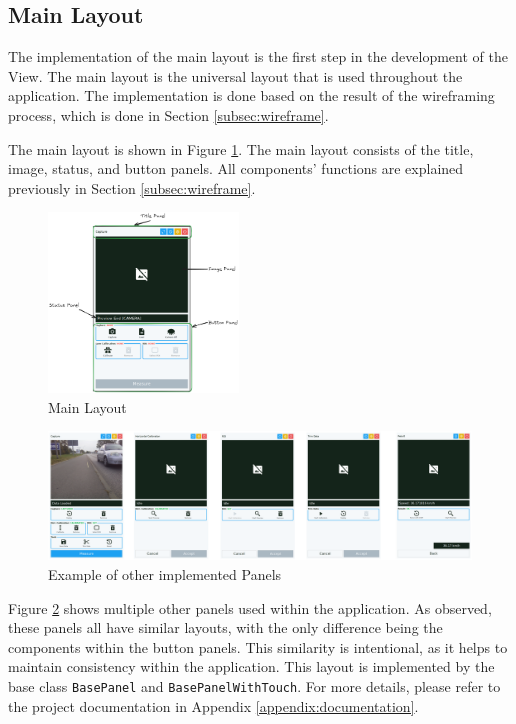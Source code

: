 \subsection {Main Layout}
The implementation of the main layout is the first step in the development of the View. The main layout is the universal layout that is used throughout the application. The implementation is done based on the result of the wireframing process, which is done in Section \ref{subsec:wireframe}.

The main layout is shown in Figure \ref{fig:main_layout}. The main layout consists of the title, image, status, and button panels. All components' functions are explained previously in Section \ref{subsec:wireframe}.

\begin{figure}[!ht]
    \centering
    \includegraphics[width=0.45\textwidth]{texs/Part2/chapter4/image/mainlayout.png}
    \caption{Main Layout}
    \label{fig:main_layout}
\end{figure}

\begin{figure}[!ht]
    \centering
    \includegraphics[width=\textwidth]{texs/Part2/chapter4/image/otherpanel.png}
    \caption{Example of other implemented Panels}
    \label{fig:otherlayouts}
\end{figure}

Figure \ref{fig:otherlayouts} shows multiple other panels used within the application. As observed, these panels all have similar layouts, with the only difference being the components within the button panels. This similarity is intentional, as it helps to maintain consistency within the application. This layout is implemented by the base class \texttt{BasePanel} and \texttt{BasePanelWithTouch}. For more details, please refer to the project documentation in Appendix \ref{appendix:documentation}.

